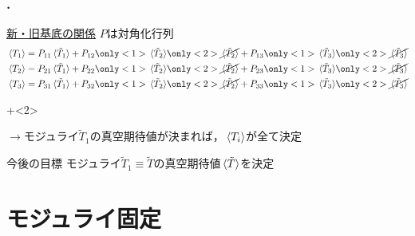 \documentclass[
  a4paper,uplatex,dvipdfmx,11pt,
  xcolor = {dvipsnames,svgnames},
  hyperref ={colorlinks=true,citecolor=Navy,linkcolor=NavyBlue,urlcolor=purple}
]{beamer}
\begin{document}
\begin{frame}
  \frametitle{\thesection.\ \secname}
  \uline{新・旧基底の関係}\hspace*{3cm} $P$は対角化行列
  \begin{align*}
    &\ev*{T_{1}}
    =
    P_{11}\ev*{\tilde{T}_{1}}
    +
    P_{12}
    \only<1>{\ev*{\tilde{T}_{2}}}
    \only<2>{\cancel{\ev*{\tilde{T}_{2}}}}
    +
    P_{13}
    \only<1>{\ev*{\tilde{T}_{3}}}
    \only<2>{\cancel{\ev*{\tilde{T}_{3}}}}
    \\
    &\ev*{T_{2}}
    =
    P_{21}\ev*{\tilde{T}_{1}}
    +
    P_{22}
    \only<1>{\ev*{\tilde{T}_{2}}}
    \only<2>{\cancel{\ev*{\tilde{T}_{2}}}}
    +
    P_{23}
    \only<1>{\ev*{\tilde{T}_{3}}}
    \only<2>{\cancel{\ev*{\tilde{T}_{3}}}}
    \\
    &\ev*{T_{3}}
    =
    P_{31}\ev*{\tilde{T}_{1}}
    +
    P_{32}
    \only<1>{\ev*{\tilde{T}_{2}}}
    \only<2>{\cancel{\ev*{\tilde{T}_{2}}}}
    +
    P_{33}
    \only<1>{\ev*{\tilde{T}_{3}}}
    \only<2>{\cancel{\ev*{\tilde{T}_{3}}}}
  \end{align*}

  \onslide+<2>{
  $\rightarrow$モジュライ$\tilde{T}_{1}$の真空期待値が決まれば，$\ev*{T_{i}}$が全て決定

  \vspace*{10pt}

  \begin{boxmine}{今後の目標}
    \centering
    モジュライ$\tilde{T}_{1}\equiv\tilde{T}$の真空期待値$\ev*{\tilde{T}}$を決定
  \end{boxmine}
  }

\end{frame}


\section{モジュライ固定}
\end{document}

